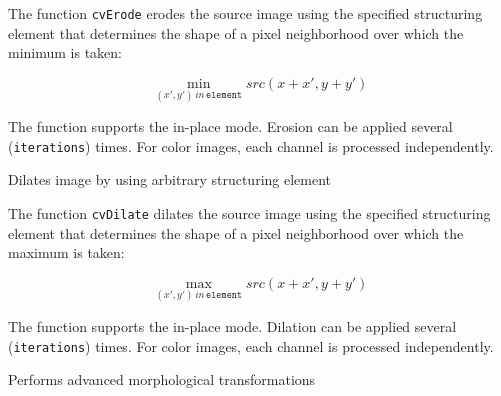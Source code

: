 \begin{description}
\end{description}

The function \texttt{cvErode} erodes the source image using the specified structuring element that determines the shape of a pixel neighborhood over which the minimum is taken:

\[
\min_{(x',y') \, in \, \texttt{element}}src(x+x',y+y')
\]

The function supports the in-place mode. Erosion can be applied several (\texttt{iterations}) times. For color images, each channel is processed independently.

\label{Dilate}

Dilates image by using arbitrary structuring element


\begin{description}
\end{description}

The function \texttt{cvDilate} dilates the source image using the specified structuring element that determines the shape of a pixel neighborhood over which the maximum is taken:

\[
\max_{(x',y') \, in \, \texttt{element}}src(x+x',y+y')
\]

The function supports the in-place mode. Dilation can be applied several (\texttt{iterations}) times. For color images, each channel is processed independently.

\label{MorphologyEx}

Performs advanced morphological transformations


